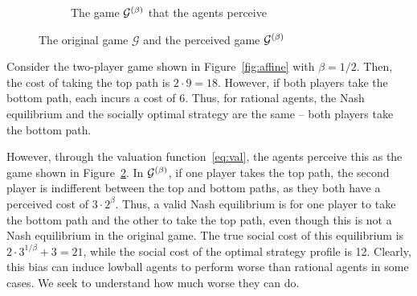 \documentclass[twoside]{article}
\begin{document}
\begin{multicols}{2}
\begin{figure}[H]
\begin{subfigure}[b]{\linewidth}
    \caption{The game $\mathcal{G}^{(\beta)}$ that the agents perceive}
    \label{fig:affinebet}
  \end{subfigure}
  \caption{The original game $\mathcal{G}$ and the perceived game
  $\mathcal{G}^{(\beta)}$}
\end{figure}
Consider the two-player game shown in Figure~\ref{fig:affine} with $\beta =
1/2$. Then, the cost of taking the top path is $2 \cdot 9 = 18$. However, if
both players take the bottom path, each incurs a cost of 6. Thus, for rational
agents, the Nash equilibrium and the socially optimal strategy are the same --
both players take the bottom path.

However, through the valuation function~\eqref{eq:val}, the agents perceive this
as the game shown in Figure~\ref{fig:affinebet}. In $\mathcal{G}^{(\beta)}$, if one
player takes the top path, the second player is indifferent between the top and
bottom paths, as they both have a perceived cost of $3 \cdot 2^\beta$. Thus, a
valid Nash equilibrium is for one player to take the bottom path and the other
to take the top path, even though this is not a Nash equilibrium in the original
game. The true social cost of this equilibrium is $2 \cdot 3^{1/\beta} + 3 =
21$, while the social cost of the optimal strategy profile is 12. Clearly, this
bias can induce lowball agents to perform worse than rational agents in some
cases. We seek to understand how much worse they can do.


\end{multicols}
\end{document}
